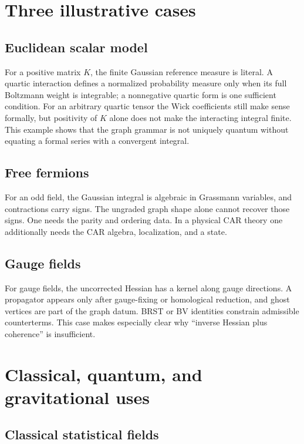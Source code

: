 \documentclass[11pt,a4paper]{article}
\begin{document}
\section{Three illustrative cases}

\subsection{Euclidean scalar model}

For a positive matrix \(K\), the finite Gaussian reference measure is
literal. A quartic interaction defines a normalized probability measure only
when its full Boltzmann weight is integrable; a nonnegative quartic form is
one sufficient condition. For an arbitrary quartic tensor the Wick
coefficients still make sense formally, but positivity of \(K\) alone does
not make the interacting integral finite. This example shows that the graph
grammar is not uniquely quantum without equating a formal series with a
convergent integral.

\subsection{Free fermions}

For an odd field, the Gaussian integral is algebraic in Grassmann
variables, and contractions carry signs.  The ungraded graph shape alone
cannot recover those signs.  One needs the parity and ordering data.  In a
physical CAR theory one additionally needs the CAR algebra, localization,
and a state.

\subsection{Gauge fields}

For gauge fields, the uncorrected Hessian has a kernel along gauge
directions.  A propagator appears only after gauge-fixing or homological
reduction, and ghost vertices are part of the graph datum.  BRST or BV
identities constrain admissible counterterms.  This case makes especially
clear why ``inverse Hessian plus coherence'' is insufficient.

\section{Classical, quantum, and gravitational uses}

\subsection{Classical statistical fields}
\end{document}
